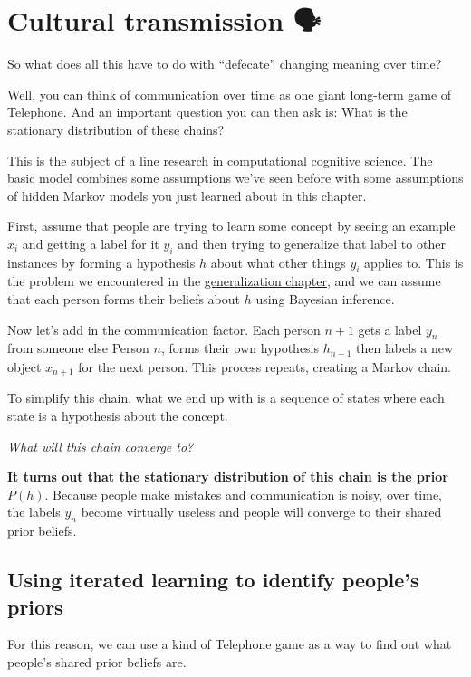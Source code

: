 \documentclass[
  letterpaper,
  DIV=11,
  numbers=noendperiod]{scrreprt}
\begin{document}
\section{Cultural transmission 🗣}\label{cultural-transmission}

So what does all this have to do with ``defecate'' changing meaning over
time?

Well, you can think of communication over time as one giant long-term
game of Telephone. And an important question you can then ask is: What
is the stationary distribution of these chains?

This is the subject of a line research in computational cognitive
science. The basic model combines some assumptions we've seen before
with some assumptions of hidden Markov models you just learned about in
this chapter.

First, assume that people are trying to learn some concept by seeing an
example \(x_i\) and getting a label for it \(y_i\) and then trying to
generalize that label to other instances by forming a hypothesis \(h\)
about what other things \(y_i\) applies to. This is the problem we
encountered in the \hyperref[generalization]{generalization chapter},
and we can assume that each person forms their beliefs about \(h\) using
Bayesian inference.

Now let's add in the communication factor. Each person \(n+1\) gets a
label \(y_n\) from someone else Person \(n\), forms their own hypothesis
\(h_{n+1}\) then labels a new object \(x_{n+1}\) for the next person.
This process repeats, creating a Markov chain.

To simplify this chain, what we end up with is a sequence of states
where each state is a hypothesis about the concept.

\emph{What will this chain converge to?}

\textbf{It turns out that the stationary distribution of this chain is
the prior} \(P(h)\). Because people make mistakes and communication is
noisy, over time, the labels \(y_n\) become virtually useless and people
will converge to their shared prior beliefs.

\subsection{Using iterated learning to identify people's
priors}\label{using-iterated-learning-to-identify-peoples-priors}

For this reason, we can use a kind of Telephone game as a way to find
out what people's shared prior beliefs are.
\end{document}

